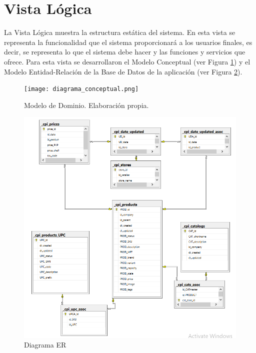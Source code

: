 \pagebreak
\section{Vista Lógica} \label{vistaLogica}
La Vista Lógica muestra la estructura estática del sistema. En esta vista se representa la funcionalidad que el sistema proporcionará a los usuarios finales, es decir, se representa lo que el sistema debe hacer y las funciones y servicios que ofrece. Para esta vista se desarrollaron el Modelo Conceptual (ver Figura \ref{fig:diagrama_conceptual}) y el Modelo Entidad-Relación de la Base de Datos de la aplicación (ver Figura \ref{fig:er}). 

\begin{figure}[H]
   \texttt{[image: diagrama\_conceptual.png]}
   \caption{Modelo de Dominio. Elaboración propia.}
   \label{fig:diagrama_conceptual}
   \centering
\end{figure}

\begin{figure}[H]
       \includegraphics[width=\textwidth]{er.png}
       \caption{Diagrama ER}
       \label{fig:er}
       \centering
 \end{figure}